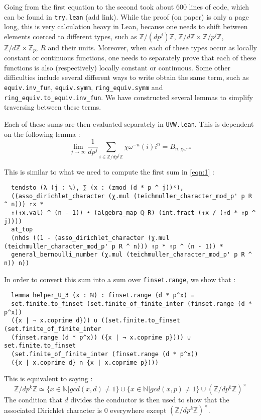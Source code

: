 \documentclass[a4paper,UKenglish,cleveref, autoref, thm-restate]{lipics-v2021}
\newcommand{\lean}[1]{\texttt{#1}\xspace} %
\begin{document}
Going from the first equation to the second took about 600 lines of code, which can be found in \lean{try.lean} (add link). While the proof (on paper) is only a page long, 
this is very calculation heavy in Lean, because one needs to shift between elements coerced to different types, such as $\mathbb{Z}/ (d p^j) \mathbb{Z}$, 
$\mathbb{Z}/ d \mathbb{Z} \times \mathbb{Z}/ p^j \mathbb{Z}$, $\mathbb{Z}/ d \mathbb{Z} \times \mathbb{Z}_p$, $R$ and their units. Moreover, when each of these types occur 
as locally constant or continuous functions, one needs to separately prove that each of these functions 
is also (respectively) locally constant or continuous. Some other difficulties include several different ways to write obtain the same term, such as \lean{equiv.inv\_fun}, 
\lean{equiv.symm}, \lean{ring\_equiv.symm} and \lean{ring\_equiv.to\_equiv.inv\_fun}. We have constructed several lemmas to simplify traversing between these terms. 

Each of these sums are then evaluated separately in \lean{UVW.lean}. This is dependent on the following lemma : 
$$ \lim_{j \to \infty} \frac{1}{d p^j} \sum_{i \in \mathbb{Z}/ d p^j \mathbb{Z}} \chi \omega^{-n} (i) i^n = B_{n, \chi \omega^{-n}} $$ 

This is similar to what we need to compute the first sum in \eqref{eqn:1} :
\begin{lstlisting}
  tendsto (λ (j : ℕ), ∑ (x : (zmod (d * p ^ j))ˣ),
  ((asso_dirichlet_character (χ.mul (teichmuller_character_mod_p' p R ^ n))) ↑x *
  ↑(↑x.val) ^ (n - 1)) • (algebra_map ℚ R) (int.fract (↑x / (↑d * ↑p ^ j))))
  at_top
  (nhds ((1 - (asso_dirichlet_character (χ.mul (teichmuller_character_mod_p' p R ^ n))) ↑p * ↑p ^ (n - 1)) *
  general_bernoulli_number (χ.mul (teichmuller_character_mod_p' p R ^ n)) n))
\end{lstlisting}

In order to convert this sum into a sum over \lean{finset.range}, we show that :
\begin{lstlisting}
  lemma helper_U_3 (x : ℕ) : finset.range (d * p^x) = 
  set.finite.to_finset (set.finite_of_finite_inter (finset.range (d * p^x)) 
  ({x | ¬ x.coprime d})) ∪ ((set.finite.to_finset (set.finite_of_finite_inter 
  (finset.range (d * p^x)) ({x | ¬ x.coprime p}))) ∪ set.finite.to_finset 
  (set.finite_of_finite_inter (finset.range (d * p^x)) 
  ({x | x.coprime d} ∩ {x | x.coprime p}))) 
\end{lstlisting}

This is equivalent to saying :
$$ \mathbb{Z} / d p^k \mathbb{Z} \simeq \{ x \in \mathbb{N} | gcd (x, d) \ne 1 \} \cup \{ x \in \mathbb{N} | gcd (x, p) \ne 1 \} 
\cup (\mathbb{Z} / d p^k \mathbb{Z})^{\times} $$
The condition that $d$ divides the conductor is then used to show that the associated Dirichlet character is 0 everywhere except 
$(\mathbb{Z} / d p^k \mathbb{Z})^{\times}$. 
\end{document}
